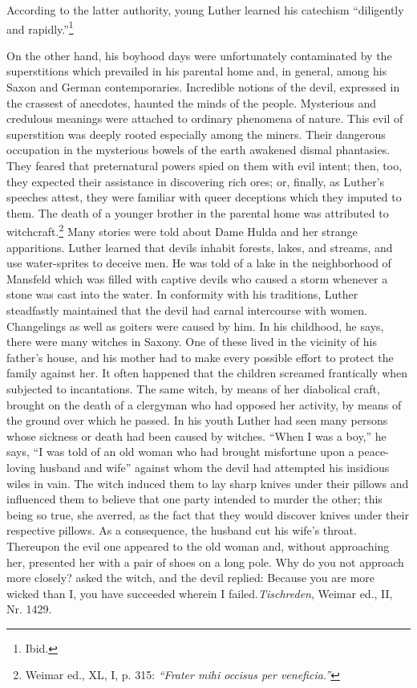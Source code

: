 According to the latter authority, young Luther learned his catechism “diligently and rapidly.”\footnote{Ibid.}

On the other hand, his boyhood days were unfortunately contaminated by the superstitions which prevailed in his parental home
and, in general, among his Saxon and German contemporaries. Incredible notions of the devil, expressed in the crassest of anecdotes,
haunted the minds of the people. Mysterious and credulous meanings were attached to ordinary phenomena of nature. This evil of
superstition was deeply rooted especially among the miners. Their
dangerous occupation in the mysterious bowels of the earth awakened
dismal phantasies. They feared that preternatural powers spied on
them with evil intent; then, too, they expected their assistance in
discovering rich ores; or, finally, as Luther’s speeches attest, they were
familiar with queer deceptions which they imputed to them. The
death of a younger brother in the parental home was attributed to
witchcraft.\footnote{Weimar ed., XL, I, p. 315: \textit{“Frater mihi occisus per veneficia.”}}
Many stories were told about Dame Hulda and her
strange apparitions. Luther learned that devils inhabit forests, lakes,
and streams, and use water-sprites to deceive men. He was told of
a lake in the neighborhood of Mansfeld which was filled with
captive devils who caused a storm whenever a stone was cast
into the water. In conformity with his traditions, Luther steadfastly maintained that the devil had carnal intercourse with women.
Changelings as well as goiters were caused by him. In his childhood,
he says, there were many witches in Saxony. One of these lived in
the vicinity of his father’s house, and his mother had to make every
possible effort to protect the family against her. It often happened
that the children screamed frantically when subjected to incantations.
The same witch, by means of her diabolical craft, brought on the
death of a clergyman who had opposed her activity, by means of
the ground over which he passed. In his youth Luther had seen many
persons whose sickness or death had been caused by witches. “When
I was a boy,” he says, “I was told of an old woman who had brought
misfortune upon a peace-loving husband and wife” against whom
the devil had attempted his insidious wiles in vain. The witch induced them to lay sharp knives under their pillows and influenced
them to believe that one party intended to murder the other; this
being so true, she averred, as the fact that they would discover
knives under their respective pillows. As a consequence, the husband
cut his wife’s throat. Thereupon the evil one appeared to the old
woman and, without approaching her, presented her with a pair
of shoes on a long pole. Why do you not approach more closely?
asked the witch, and the devil replied: Because you are more wicked
than I, you have succeeded wherein I failed.\textit{Tischreden}, Weimar ed., II, Nr. 1429.

